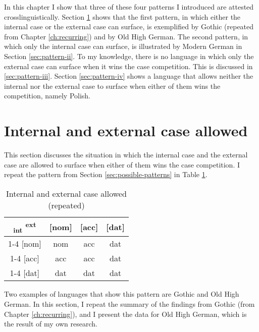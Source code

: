 In this chapter I show that three of these four patterns I introduced are attested crosslinguistically. Section \ref{sec:pattern-i} shows that the first pattern, in which either the internal case or the external case can surface, is exemplified by Gothic (repeated from Chapter \ref{ch:recurring}) and by Old High German. The second pattern, in which only the internal case can surface, is illustrated by Modern German in Section \ref{sec:pattern-ii}. To my knowledge, there is no language in which only the external case can surface when it wins the case competition. This is discussed in \ref{sec:pattern-iii}. Section \ref{sec:pattern-iv} shows a language that allows neither the internal nor the external case to surface when either of them wins the competition, namely Polish.


\section{Internal and external case allowed}\label{sec:pattern-i}

This section discusses the situation in which the internal case and the external case are allowed to surface when either of them wins the case competition. I repeat the pattern from Section \ref{sec:possible-patterns} in Table \ref{tbl:case-competition-int-ext-repeated}.

\begin{table}[H]
  \center
  \caption{Internal and external case allowed (repeated)}
  \begin{tabular}{c|c|c|c}
    \toprule
    \textsubscript{\ac{int}} \textsuperscript{\ac{ext}}
           & [\ac{nom}]
           & [\ac{acc}]
           & [\ac{dat}]
           \\ \cmidrule{1-4}
       [\ac{nom}]
           & \ac{nom}
           & \ac{acc}
           & \ac{dat}
           \\ \cmidrule{1-4}
       [\ac{acc}]
           & \ac{acc}
           & \ac{acc}
           & \ac{dat}
           \\ \cmidrule{1-4}
       [\ac{dat}]
           & \ac{dat}
           & \ac{dat}
           & \ac{dat}
           \\
     \bottomrule
  \end{tabular}
    \label{tbl:case-competition-int-ext-repeated}
\end{table}

Two examples of languages that show this pattern are Gothic and Old High German. In this section, I repeat the summary of the findings from Gothic (from Chapter \ref{ch:recurring}), and I present the data for Old High German, which is the result of my own research.

